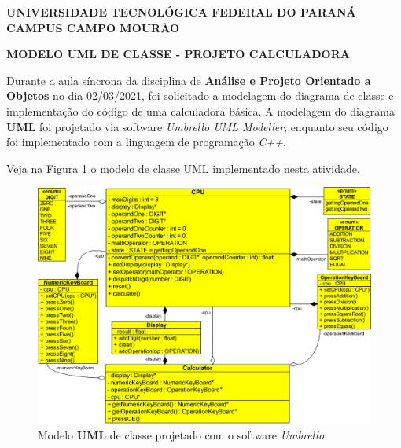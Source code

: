 \documentclass[a4paper, 12pt]{article}
\begin{document}
	
	\hspace{0.3cm}
	
	\begin{large}
		\begin{center}
			\textbf{UNIVERSIDADE TECNOLÓGICA FEDERAL DO PARANÁ}\newline
			\textbf{CAMPUS CAMPO MOURÃO}
		\end{center}
	\end{large}
	
	\vspace{0.3cm}
	
	\begin{center}
		\textbf{MODELO UML DE CLASSE - PROJETO CALCULADORA}
	\end{center}

	\vspace{0.3cm}
	
	\onehalfspacing
	Durante a aula síncrona da disciplina de \textbf{Análise e Projeto Orientado a Objetos} no dia 02/03/2021, foi solicitado a modelagem do diagrama de classe e implementação do código de uma calculadora básica. A modelagem do diagrama \textbf{UML} foi projetado via software \textit{Umbrello UML Modeller}, enquanto seu código foi implementado com a linguagem de programação \textit{C++}.
	
	Veja na Figura \ref{ModeloClasseUML} o modelo de classe UML implementado nesta atividade.
	
	
	\begin{figure}[H]
		\centering
		
		\includegraphics[scale=0.115]{Calculator.png}
		
		\caption{Modelo \textbf{UML} de classe projetado com o software \textit{Umbrello}}
		\label{ModeloClasseUML}
	\end{figure}
\end{document}
